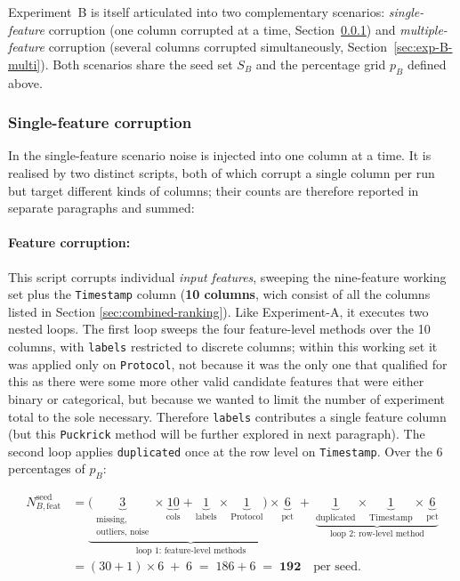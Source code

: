 \documentclass[../main.tex]{subfiles}
\begin{document}
Experiment~B is itself articulated into two complementary scenarios: \emph{single-feature} corruption (one column corrupted at a time, Section~\ref{sec:exp-B-single}) and \emph{multiple-feature} corruption (several columns corrupted simultaneously, Section~\ref{sec:exp-B-multi}).  Both scenarios share the seed set $S_{B}$ and the percentage grid $p_{B}$ defined above.

\subsubsection{Single-feature corruption}
\label{sec:exp-B-single}

In the single-feature scenario noise is injected into one column at a time.  It is realised by two distinct scripts, both of which corrupt a single column per run but target different kinds of columns; their counts are therefore reported in separate paragraphs and summed:

\paragraph{Feature corruption:}
This script corrupts individual \emph{input features}, sweeping the nine-feature working set plus the \texttt{Timestamp} column (\textbf{10 columns}, wich consist of all the columns listed in Section \ref{sec:combined-ranking}). Like Experiment-A, it executes two nested loops.  The first loop sweeps the four feature-level methods over the 10 columns, with \texttt{labels} restricted to discrete columns; within this working set it was applied only on \texttt{Protocol}, not because it was the only one that qualified for this as there were some more other valid candidate features that were either binary or categorical, but because we wanted to limit the number of experiment total to the sole necessary. Therefore \texttt{labels} contributes a single feature column (but this \texttt{Puckrick} method will be further explored in next paragraph). The second loop applies \texttt{duplicated} once at the row level on \texttt{Timestamp}.  Over the $6$ percentages of $p_{B}$:

\begin{align*}
N_{B,\text{feat}}^{\text{seed}}
&= \underbrace{\bigl( \underbrace{3}_{\substack{\text{missing,}\\\text{outliers, noise}}} \times \underbrace{10}_{\text{cols}} + \underbrace{1}_{\text{labels}} \times \underbrace{1}_{\text{Protocol}} \bigr) \times \underbrace{6}_{\text{pct}}}_{\text{loop 1: feature-level methods}}
   \;+\; \underbrace{\underbrace{1}_{\text{duplicated}} \times \underbrace{1}_{\text{Timestamp}} \times \underbrace{6}_{\text{pct}}}_{\text{loop 2: row-level method}} \\[4pt]
&= (30 + 1)\times 6 \;+\; 6 \;=\; 186 + 6 \;=\; \mathbf{192} \quad\text{per seed.}
\end{align*}
\end{document}
